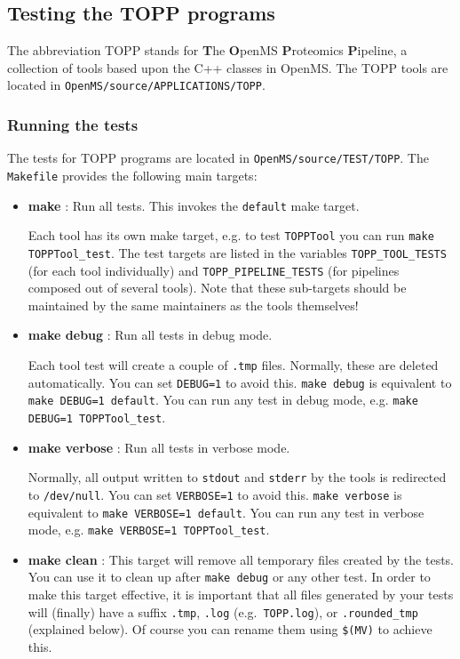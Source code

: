 \documentclass[a4]{article}
\begin{document}
\subsection{Testing the TOPP programs}

The abbreviation TOPP stands for \textbf{T}he \textbf{O}penMS
\textbf{P}roteomics \textbf{P}ipeline, a collection of tools based upon the
C++ classes in OpenMS.  The TOPP tools are located in \texttt{OpenMS/source/APPLICATIONS/TOPP}.

\subsubsection{Running the tests}

The tests for TOPP programs are located in \texttt{OpenMS/source/TEST/TOPP}.
The \texttt{Makefile} provides the following main targets:
\begin{itemize}
 \item \textbf{make} : Run all tests.  This invokes the \texttt{default} make target.

  Each tool has its own make target, e.g. to test \texttt{TOPPTool}
  you can run \texttt{make TOPPTool\_test}.  The test targets are listed in
  the variables \texttt{TOPP\_TOOL\_TESTS} (for each tool individually) and
  \texttt{TOPP\_PIPELINE\_TESTS} (for pipelines composed out of several
  tools).  Note that these sub-targets should be maintained by the same
  maintainers as the tools themselves!
  
 \item \textbf{make debug} : Run all tests in debug mode.

  Each tool test will create a couple of \texttt{.tmp} files.  Normally, these
  are deleted automatically.  You can set \texttt{DEBUG=1} to avoid this.
  \texttt{make debug} is equivalent to \texttt{make DEBUG=1 default}.  You can
  run any test in debug mode, e.g.  \texttt{make DEBUG=1 TOPPTool\_test}.

 \item \textbf{make verbose} : Run all tests in verbose mode.

  Normally, all output written to \texttt{stdout} and \texttt{stderr} by the
  tools is redirected to \texttt{/dev/null}.  You can set \texttt{VERBOSE=1}
  to avoid this.  \texttt{make verbose} is equivalent to \texttt{make
    VERBOSE=1 default}.  You can run any test in verbose mode, e.g.
  \texttt{make VERBOSE=1 TOPPTool\_test}.

 \item \textbf{make clean} : This target will remove all temporary files
  created by the tests.  You can use it to clean up after \texttt{make debug}
  or any other test.  In order to make this target effective, it is important
  that all files generated by your tests will (finally) have a suffix
  \texttt{.tmp}, \texttt{.log} (e.g.\ \texttt{TOPP.log}), or
  \texttt{.rounded\_tmp} (explained below).  Of course you can rename them
  using \texttt{\$(MV)} to achieve this.

\end{itemize}
\end{document}
